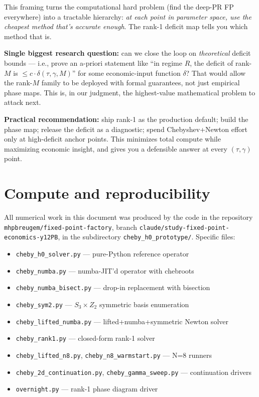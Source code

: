 \documentclass[11pt]{article}
\begin{document}
This framing turns the computational hard problem (find the deep-PR FP everywhere) into
a tractable hierarchy: \emph{at each point in parameter space, use the cheapest method
that's accurate enough}. The rank-1 deficit map tells you which method that is.

\textbf{Single biggest research question:} can we close the loop on \emph{theoretical}
deficit bounds — i.e., prove an a-priori statement like ``in regime $R$, the deficit of
rank-$M$ is $\le c\cdot\delta(\tau,\gamma,M)$'' for some economic-input function $\delta$?
That would allow the rank-$M$ family to be deployed with formal guarantees, not just
empirical phase maps. This is, in our judgment, the highest-value mathematical problem
to attack next.

\textbf{Practical recommendation:} ship rank-1 as the production default; build the
phase map; release the deficit as a diagnostic; spend Chebyshev+Newton effort only
at high-deficit anchor points. This minimizes total compute while maximizing economic
insight, and gives you a defensible answer at every $(\tau, \gamma)$ point.

\appendix
\section{Compute and reproducibility}

All numerical work in this document was produced by the code in the repository
\texttt{mhpbreugem/fixed-point-factory}, branch
\texttt{claude/study-fixed-point-economics-y12PB}, in the subdirectory
\texttt{cheby\_h0\_prototype/}. Specific files:

\begin{itemize}
\item \texttt{cheby\_h0\_solver.py} — pure-Python reference operator
\item \texttt{cheby\_numba.py} — numba-JIT'd operator with chebroots
\item \texttt{cheby\_numba\_bisect.py} — drop-in replacement with bisection
\item \texttt{cheby\_sym2.py} — $S_3\times Z_2$ symmetric basis enumeration
\item \texttt{cheby\_lifted\_numba.py} — lifted+numba+symmetric Newton solver
\item \texttt{cheby\_rank1.py} — closed-form rank-1 solver
\item \texttt{cheby\_lifted\_n8.py}, \texttt{cheby\_n8\_warmstart.py} — N=8 runners
\item \texttt{cheby\_2d\_continuation.py}, \texttt{cheby\_gamma\_sweep.py} — continuation drivers
\item \texttt{overnight.py} — rank-1 phase diagram driver
\end{itemize}
\end{document}
